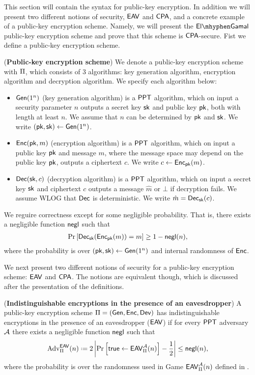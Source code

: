 This section will contain the syntax for public-key encryption. In addition we will present two different notions of security, $\mathsf{EAV}$ and $\mathsf{CPA}$, and a concrete example of a public-key encryption scheme. Namely, we will present the $\elGamal$ public-key encryption scheme and prove that this scheme is $\mathsf{CPA}$-secure. Fist we define a public-key encryption scheme. 

\begin{defn}
(\textbf{Public-key encryption scheme}) We denote a public-key encryption scheme with $\operatorname{\Pi}$, which consists of 3 algorithms: key generation algorithm, encryption algorithm and decryption algorithm. We specify each algorithm below: 
\begin{itemize}
	\itemsep-0.1em
	\item $\operatorname{\mathsf{Gen}}(1^n)$ (key generation algorithm) is a $\mathsf{PPT}$ algorithm, which on input a security parameter $n$ outputs a secret key $\mathsf{sk}$ and public key $\mathsf{pk}$, both with length at least $n$. We assume that $n$ can be determined by $\mathsf{pk}$ and $\mathsf{sk}$. We write $(\mathsf{pk},\mathsf{sk})\leftarrow\operatorname{\mathsf{Gen}}(1^n)$. 
	\item $\operatorname{\mathsf{Enc}}(\mathsf{pk},m)$ (encryption algorithm) is a $\mathsf{PPT}$ algorithm, which on input a public key $\mathsf{pk}$ and message $m$, where the message space may depend on the public key $\mathsf{pk}$, outputs a ciphertext $c$. We write $c\leftarrow\operatorname{\mathsf{Enc}}_{\mathsf{pk}}(m)$.
	\item $\operatorname{\mathsf{Dec}}(\mathsf{sk},c)$ (decryption algorithm) is a $\mathsf{PPT}$ algorithm, which on input a secret key $\mathsf{sk}$ and ciphertext $c$ outputs a message $\hat{m}$ or $\bot$ if decryption fails. We assume WLOG that $\operatorname{\mathsf{Dec}}$ is deterministic. We write $\hat{m} = \operatorname{\mathsf{Dec}}_{\mathsf{sk}}(c)$.
\end{itemize}
We reguire correctness except for some negligible probability. That is, there exists a negligible function $\operatorname{\mathsf{negl}}$ such that 
\begin{align*}
	\operatorname{Pr}\left[{\operatorname{\mathsf{Dec}}_{\mathsf{sk}}(\operatorname{\mathsf{Enc}}_{\mathsf{pk}}(m))=m}\right]\geq 1-\operatorname{\mathsf{negl}}(n),
\end{align*}
where the probability is over $(\mathsf{pk},\mathsf{sk})\leftarrow \operatorname{\mathsf{Gen}}(1^n)$ and internal randomness of $\operatorname{\mathsf{Enc}}$.
\end{defn}

We next present two different notions of security for a public-key encryption scheme: $\mathsf{EAV}$ and $\mathsf{CPA}$. The notions are equivalent though, which is discussed after the presentation of the definitions. 

\begin{defn}
(\textbf{Indistinguishable encryptions in the presence of an eavesdropper}) A public-key encryption scheme $\operatorname{\Pi} = (\operatorname{\mathsf{Gen}},\operatorname{\mathsf{Enc}},\operatorname{\mathsf{Dev}})$ has indistinguishable encryptions in the presence of an eavesdropper ($\mathsf{EAV}$) if for every $\mathsf{PPT}$ adversary $\mathcal{A}$ there exists a negligible function $\operatorname{\mathsf{negl}}$ such that
\begin{align*}
	\adv_{\spkcs}^{\EAV}(n)\defeq 2\left\vert \prob{\true\leftarrow \EAV_{\spkcs}^{\adve}(n)} - \frac{1}{2}\right\vert \leq \negl(n),
\end{align*}
where the probability is over the randomness used in Game $\mathsf{EAV}_{\operatorname{\Pi}}^{\mathcal{A}}(n)$ defined in .
\end{defn}

